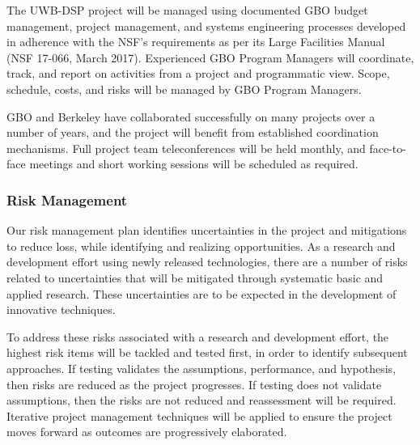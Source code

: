 \documentclass[10pt]{myNSF}
\begin{document}
\label{sec:organization}

The UWB-DSP project will be managed using documented GBO budget
management, project management, and systems engineering processes
developed in adherence with the NSF’s requirements as per its Large
Facilities Manual (NSF 17-066, March 2017). Experienced GBO Program
Managers will coordinate, track, and report on activities from a
project and programmatic view. Scope, schedule, costs, and risks will
be managed by GBO Program Managers.

GBO and Berkeley have collaborated successfully on many projects over
a number of years, and the project will benefit from established
coordination mechanisms. Full project team teleconferences will be
held monthly, and face-to-face meetings and short working sessions
will be scheduled as required.

\subsubsection{Risk Management}
\label{sec:risk_management}

Our risk management plan identifies uncertainties in the project and
mitigations to reduce loss, while identifying and realizing
opportunities. As a research and development effort using newly
released technologies, there are a number of risks related to
uncertainties that will be mitigated through systematic basic and
applied research. These uncertainties are to be expected in the
development of innovative techniques.

To address these risks associated with a research and development
effort, the highest risk items will be tackled and tested first, in
order to identify subsequent approaches. If testing validates the
assumptions, performance, and hypothesis, then risks are reduced as
the project progresses. If testing does not validate assumptions, then
the risks are not reduced and reassessment will be required. Iterative
project management techniques will be applied to ensure the project
moves forward as outcomes are progressively elaborated.
\end{document}
